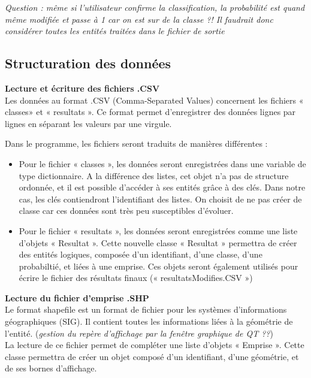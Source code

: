 \noindent\textit{Question : même si l'utilisateur confirme la classification, la probabilité est quand même modifiée et passe à 1 car on est sur de la classe ?! Il faudrait donc considérer toutes les entités traitées dans le fichier de sortie }

\subsection{Structuration des données}

\noindent\textbf{Lecture et écriture des fichiers .CSV}\\

Les données au format .CSV (Comma-Separated Values) concernent les fichiers « classes» et « resultats ». Ce format permet d’enregistrer des données lignes par lignes en séparant les valeurs par une virgule. \newline

Dans le programme, les fichiers seront traduits de manières différentes :

\begin{itemize}[label=$\rightarrow$]
	\item Pour le fichier « classes », les données seront enregistrées dans une variable de type dictionnaire. A la différence des listes, cet objet n’a pas de structure ordonnée, et il est possible d’accéder à ses entités grâce à des clés. Dans notre cas, les clés contiendront l’identifiant des listes. On choisit de ne pas créer de classe car ces données sont très peu susceptibles d’évoluer.
	\item Pour le fichier « resultats », les données seront enregistrées comme une liste d’objets « Resultat ». Cette nouvelle classe « Resultat » permettra de créer des entités logiques, composée d’un identifiant, d’une classe, d’une probabiltié, et liées à une emprise. Ces objets seront également utilisés pour écrire le fichier des résultats finaux (« resultatsModifies.CSV »)
\end{itemize}

\noindent\textbf{Lecture du fichier d’emprise .SHP}\\

Le format shapefile est un format de fichier pour les systèmes d'informations géographiques (SIG). Il contient toutes les informations liées à la géométrie de l’entité. (\textit{gestion du repère d’affichage par la fenêtre graphique de QT ??})\\

La lecture de ce fichier permet de compléter une liste d’objets « Emprise ». Cette classe permettra de créer un objet composé d’un identifiant, d’une géométrie, et de ses bornes d’affichage.\\

